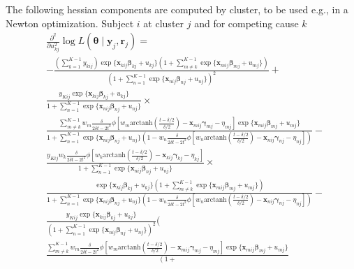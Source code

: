 \documentclass[12pt, %
               openright, %
               oneside, %
               a4paper, %
               chapter=TITLE, %
               section=TITLE, %
               brazil,
               english %
]{abntex2}
\begin{document}
\begin{apendicesenv}
The following hessian components are computed by cluster, to be used
e.g., in a Newton optimization. Subject \(i\) at cluster \(j\) and for
competing cause \(k\)
\begin{align*}
  &\frac{\partial^{2}}{\partial u_{kj}^{2}}
    \log L(\bm{\theta}\mid\bm{y}_{j}, \bm{r}_{j}) =\\
  &-\frac{\left(\sum_{k = 1}^{K-1} y_{kij}\right)
    \exp\{\bm{x}_{kij}\bm{\beta}_{kj} + u_{kj}\}
    \left(1 +
    \sum_{m \neq k}^{K-1}\exp\{\bm{x}_{mij}\bm{\beta}_{mj} + u_{mj}\}
    \right)}{\left(1 +
    \sum_{n = 1}^{K-1}\exp\{\bm{x}_{nij}\bm{\beta}_{nj} + u_{nj}\}
    \right)^{2}} +\\
  &\frac{y_{Kij}
    \exp\{\bm{x}_{kij} \bm{\beta}_{kj} + u_{kj}\}}{
    1 + \sum_{n = 1}^{K-1}\exp\{\bm{x}_{nij} \bm{\beta}_{nj} + u_{nj}\}
    }\times\\
  &\frac{
    \sum_{m \neq k}^{K-1}w_{m}\frac{\delta}{2\delta t - 2t^{2}}
    \phi[w_{m}\text{arctanh}\left(\frac{t-\delta/2}{\delta/2}\right)
    - \bm{x}_{mij}\bm{\gamma}_{mj} - \eta_{mj}]
    \exp\{\bm{x}_{mij}\bm{\beta}_{mj} + u_{mj}\}}{1 +
    \sum_{n = 1}^{K-1}\exp\{\bm{x}_{nij}\bm{\beta}_{nj} + u_{nj}\}
    (1 - w_{n}\frac{\delta}{2\delta t - 2t^{2}}
    \phi[w_{n}\text{arctanh}\left(\frac{t-\delta/2}{\delta/2}\right)
    - \bm{x}_{nij}\bm{\gamma}_{nj} - \eta_{nj}])} -\\
  &\frac{
    y_{Kij}
    w_{k}\frac{\delta}{2\delta t - 2t^{2}}
    \phi[w_{k}\text{arctanh}\left(\frac{t-\delta/2}{\delta/2}\right)
    - \bm{x}_{kij}\bm{\gamma}_{kj} - \eta_{kj}] }{1 +
    \sum_{n = 1}^{K-1}\exp\{\bm{x}_{nij}\bm{\beta}_{nj} + u_{nj}\}
    }\times\\
  &\frac{\exp\{\bm{x}_{kij}\bm{\beta}_{kj} + u_{kj}\}
    \left(1 +
    \sum_{m \neq k}^{K-1}\exp\{\bm{x}_{mij}\bm{\beta}_{mj} + u_{mj}\}
    \right)}{1 +
    \sum_{n = 1}^{K-1}\exp\{\bm{x}_{nij}\bm{\beta}_{nj} + u_{nj}\}
    (1 - w_{n}\frac{\delta}{2\delta t - 2t^{2}}
    \phi[w_{n}\text{arctanh}\left(\frac{t-\delta/2}{\delta/2}\right)
    - \bm{x}_{nij}\bm{\gamma}_{nj} - \eta_{nj}])} -\\
  &\frac{y_{Kij}\exp\{\bm{x}_{kij}\bm{\beta}_{kj} + u_{kj}\}}{\left(1 +
    \sum_{n = 1}^{K-1}\exp\{\bm{x}_{nij}\bm{\beta}_{nj} + u_{nj}\}
    \right)^{2}}\Bigg(\\
  &\frac{\sum_{m \neq k}^{K-1}
    w_{m}\frac{\delta}{2\delta t - 2t^{2}}
    \phi[w_{m}\text{arctanh}\left(\frac{t-\delta/2}{\delta/2}\right)
    - \bm{x}_{mij}\bm{\gamma}_{mj} - \eta_{mj}]
    \exp\{\bm{x}_{mij}\bm{\beta}_{mj} + u_{mj}\}}{\left(1 +
}
\end{align*}
\end{apendicesenv}
\end{document}
